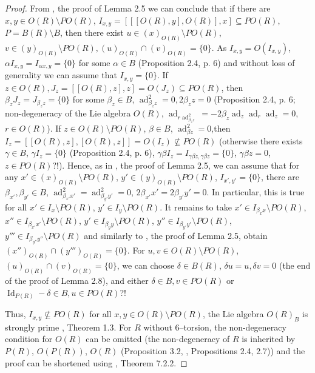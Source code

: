 \documentclass[a4paper,11pt]{article}
\DeclareMathOperator{\ad}{ad}
\DeclareMathOperator{\Id}{Id}
\begin{document}
\begin{proof}
From \cite{GK}, the proof of Lemma 2.5 we can conclude that if there are 
$x, y\in O(R)\setminus P O(R)$, 
${I_{x, y}=[[[O(R), y], O(R)], x]\subseteq P O(R)}$, ${P=B(R)\setminus B}$, 
then there exist $u\in (x)_{O(R)}\setminus P O(R)$, 
${v\in (y)_{O(R)}\setminus P O(R), (u)_{O(R)}\cap (v)_{O(R)}=\{0\}}$. 
As ${I_{x, y}=O(I_{x, y})}$, ${\alpha I_{x, y}=I_{\alpha x, y}=\{0\}}$ 
for some ${\alpha\in B}$ (Proposition 2.4, p. 6) and without loss of 
generality we can assume that ${I_{x, y}=\{0\}}$. 
If ${z\in O(R), J_z=[[O(R), z], z]=O(J_z)\subseteq P O(R)}$, then 
${\beta_z J_z=J_{\beta_z z}=\{0\}}$ for some ${\beta_z\in B}$, 
${\ad_{\beta_z z}^2=0, 2 \beta_z z=0}$ 
(Proposition 2.4, p. 6; non-degeneracy of the Lie algebra 
$O(R)$, ${\ad_{r \ad_{\beta_z z}^2}=-2 \beta_z \ad_z \ad_r \ad_z=0}$, 
${r\in O(R)}$). If ${z\in O(R)\setminus P O(R)}$, ${\beta\in B}$, 
${\ad_{\beta z}^2=0}$,\linebreak then 
${I_z=[[O(R), z], [O(R), z]]=O(I_z)\not\subseteq P O(R)}$ (otherwise there 
exists ${\gamma\in B}$, ${\gamma I_z=\{0\}}$ (Proposition 2.4, p. 6), 
${\gamma \beta I_z=I_{\gamma \beta z, \gamma \beta z}=\{0\}}$, 
${\gamma \beta z=0}$, ${z\in P O(R)}$?!). Hence, as in \cite{GK}, the 
proof of Lemma 2.5, we can assume that for any 
${x'\in (x)_{O(R)}\setminus P O(R)}$, 
${y'\in (y)_{O(R)}\setminus P O(R)}$, ${I_{x', y'}=\{0\}}$, there are 
${\beta_{x'}, \beta_{y'}\in B}$, 
${\ad_{\beta_{x'} x'}^2=\ad_{\beta_{y'} y'}^2=0}$, 
${2 \beta_{x'} x'=2 \beta_{y'} y'=0}$. In particular, this is true for all 
${x'\in I_x\setminus P O(R)}$, ${y'\in I_y\setminus P O(R)}$. It remains to 
take ${x'\in I_{\beta_x x}\setminus P O(R)}$, 
${x''\in I_{\beta_{x'} x'}\setminus P O(R)}$, 
${y'\in I_{\beta_y y}\setminus P O(R)}$, 
${y''\in I_{\beta_{y'} y'}\setminus P O(R)}$, 
${y'''\in I_{\beta_{y''} y''}\setminus P O(R)}$ and similarly to \cite{GK}, 
the proof of Lemma 2.5, obtain ${(x'')_{O(R)}\cap (y''')_{O(R)}=\{0\}}$. 
For $u, v\in O(R)\setminus P O(R)$, ${(u)_{O(R)}\cap (v)_{O(R)}=\{0\}}$, we 
can choose ${\delta\in B(R)}$, ${\delta u=u, \delta v=0}$ (the end of 
the proof of Lemma 2.8), and either ${\delta\in B, v\in P O(R)}$ or 
${\Id_{P(R)}-\delta\in B, u\in P O(R)}$?! 

Thus, ${I_{x, y}\not\subseteq P O(R)}$ for all ${x, y\in O(R)\setminus P O(R)}$, 
the Lie algebra $O(R)_B$ is strongly prime \cite{GK}, Theorem 1.3. For 
$R$ without $6$--torsion, the non-degeneracy condition for $O(R)$ can be 
omitted (the non-degeneracy of $R$ is inherited by 
$P(R)$, $O(P(R))$, $O(R)$ (Proposition 3.2, \cite{OMol}, Propositions 
2.4, 2.7)) and the proof can be shortened using \cite{LopJ}, Theorem 7.2.2.
\end{proof}
\end{document}
